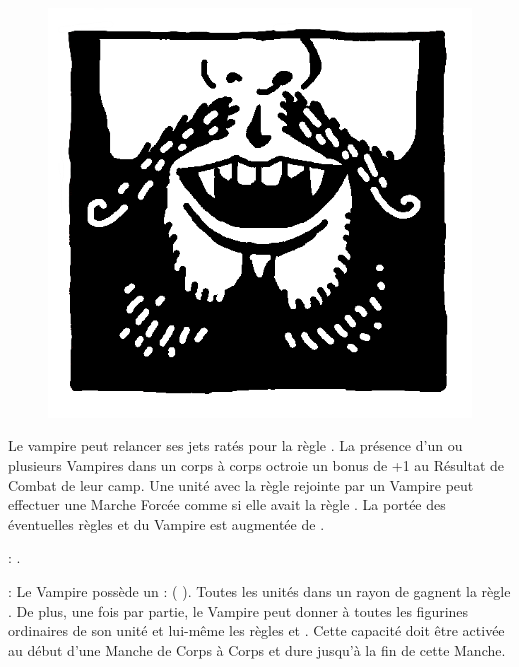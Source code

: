 \begin{figure}
\centering
\includegraphics[width=\logosize]{pics/logo_vonkarnstein.png}
\end{figure}
Le vampire peut relancer ses jets ratés pour la règle \vampiric{}. La présence d'un ou plusieurs Vampires \vonkarnstein{} dans un corps à corps octroie un bonus de +1 au Résultat de Combat de leur camp. Une unité avec la règle \undead{} rejointe par un Vampire \vonkarnstein{} peut effectuer une Marche Forcée comme si elle avait la règle \vampiric{}. La portée des éventuelles règles \inspiringpresence{} et \holdyourground{} du Vampire est augmentée de . 

\vspace{0.5cm}
\bloodties{} : \textbf{\darkcoach}.

\vspace{0.5cm}
\ancientbloodpower{} : \textbf{\stormcaller}\dotfill{}\newline%
Le Vampire possède un  : \heavensspelltwo{} (\Pathof{} \heavens{}). Toutes les unités dans un rayon de  gagnent la règle \hardtarget{}. De plus, une fois par partie, le Vampire peut donner à toutes les figurines ordinaires de son unité et lui-même les règles \lightningattacks{} et \lightningreflexes{}. Cette capacité doit être activée au début d'une Manche de Corps à Corps et dure jusqu'à la fin de cette Manche.

